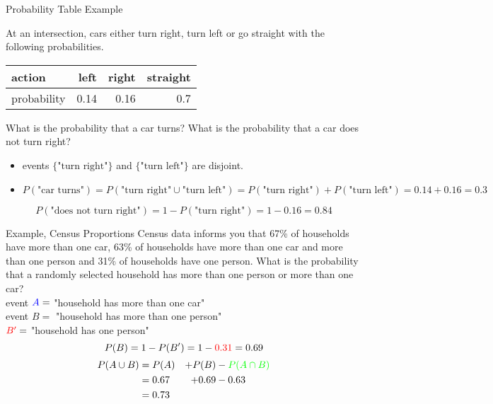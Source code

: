 \documentclass{beamer}
\newcommand{\blue}[1]{{\color{blue} #1}}
\newcommand{\red}[1]{{\color{red} #1}}
\newcommand{\grn}[1]{{\color{green} #1}}
\newcommand{\nl}[1]{\vspace{#1 em}}
\begin{document}
    \begin{frame}{Probability Table Example}
        
        At an intersection, cars either turn right, turn left or go straight with the following probabilities.
        \begin{center}
        \begin{tabular}{| l | r | r | r|}
            \hline
            action & left & right & straight \\
            \hline
            probability & 0.14 & 0.16 & 0.7 \\
            \hline
        \end{tabular}
    \end{center}
    What is the probability that a car turns? What is the probability that a car does not turn right?
    \begin{itemize}
        \item events $\{\text{"turn right"}\}$ and $\{\text{"turn left"}\}$ are disjoint.
        \item $P(\text{"car turns"}) = P(\text{"turn right"} \cup \text{"turn left"}) = P(\text{"turn right"}) + P(\text{"turn left"}) = 0.14 + 0.16 = 0.3$
    \end{itemize}
    \[P(\text{"does not turn right"}) = 1 -P(\text{"turn right"}) = 1 - 0.16 = 0.84\]

    \end{frame}

    \begin{frame}{Example, Census Proportions}
        Census data informs you that \blue{67\%} of households have more than one car, \grn{63\%} of households have more than one car and more than one person and \red{31\%} of households have one person. What is the probability that a randomly selected household has more than one person or more than one car?\\
        \nl{0.5}
        event $\blue{A} =$ "household has more than one car"\\
        \nl{0.5}
        event $B =$ "household has more than one person"\\
        \nl{0.5}
        $\red{B'} =$ "household has one person"\\
        \[P(B) = 1 - P(B') = 1 - \red{0.31} = 0.69\]
        \begin{alignat*}{3}
            P(A \cup B)  & = P(A) &+ P(B) &- \grn{P(A\cap B)}\\
                &= 0.67 &+ 0.69 &- 0.63\\
                & = 0.73
        \end{alignat*}
    \end{frame}
\end{document}

